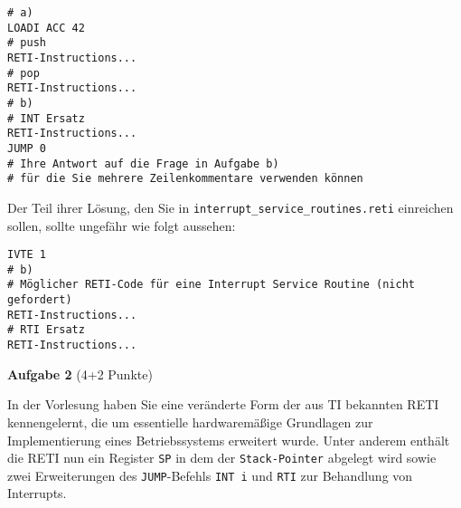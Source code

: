 \documentclass{article}
\newenvironment{adjustedminipage}[1]
  {\vspace{0.15cm}\begin{minipage}{#1}}
  {\end{minipage}}
\begin{document}
\begin{center}
	\begin{adjustedminipage}{0.9\textwidth}
		\begin{verbatim}
# a)
LOADI ACC 42
# push
RETI-Instructions...
# pop
RETI-Instructions...
# b)
# INT Ersatz
RETI-Instructions...
JUMP 0
# Ihre Antwort auf die Frage in Aufgabe b)
# für die Sie mehrere Zeilenkommentare verwenden können
    \end{verbatim}
	\end{adjustedminipage}
\end{center}

Der Teil ihrer Lösung, den Sie in \verb|interrupt_service_routines.reti| einreichen sollen, sollte ungefähr wie folgt aussehen:

\begin{center}
	\begin{adjustedminipage}{0.9\textwidth}
		\begin{verbatim}
IVTE 1
# b)
# Möglicher RETI-Code für eine Interrupt Service Routine (nicht gefordert)
RETI-Instructions...
# RTI Ersatz
RETI-Instructions...
    \end{verbatim}
	\end{adjustedminipage}
\end{center}

\vspace{0.5cm}
\textbf{Aufgabe 2} (4+2 Punkte)
\vspace{0.5cm}

In der Vorlesung haben Sie eine veränderte Form der aus TI bekannten RETI kennengelernt, die um essentielle hardwaremäßige Grundlagen zur Implementierung eines Betriebssystems erweitert wurde. Unter anderem enthält die RETI nun ein Register \verb|SP| in dem der \verb|Stack-Pointer| abgelegt wird sowie zwei Erweiterungen des \verb|JUMP|-Befehls \verb|INT i| und \verb|RTI| zur Behandlung von Interrupts.
\end{document}
